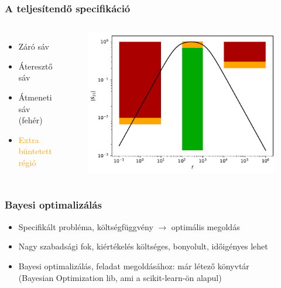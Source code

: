 \documentclass[aspectratio=43]{beamer}
\begin{document}
\begin{frame}
	\frametitle{A teljesítendő specifikáció}
	\begin{columns}
			\begin{itemize}
				\item \textcolor{stopred}{Záró sáv}
				\item \textcolor{passgreen}{Áteresztő sáv}
				\item Átmeneti sáv (fehér)
				\item \textcolor{orange}{Extra büntetett régió}
			\end{itemize}
			\begin{figure}
				\includegraphics[width=\textwidth]{plot.pdf}
			\end{figure}
	\end{columns}
\end{frame}

\begin{frame}
	\frametitle{Bayesi optimalizálás}
	\begin{itemize}
		\item Specifikált probléma, költségfüggvény $\rightarrow$ optimális megoldás
		\item Nagy szabadsági fok, kiértékelés költséges, bonyolult, időigényes lehet
		\item Bayesi optimalizálás, feladat megoldásához: már létező könyvtár\\
		(Bayesian Optimization lib, ami a scikit-learn-ön alapul)
	\end{itemize}
\end{frame}
\end{document}
